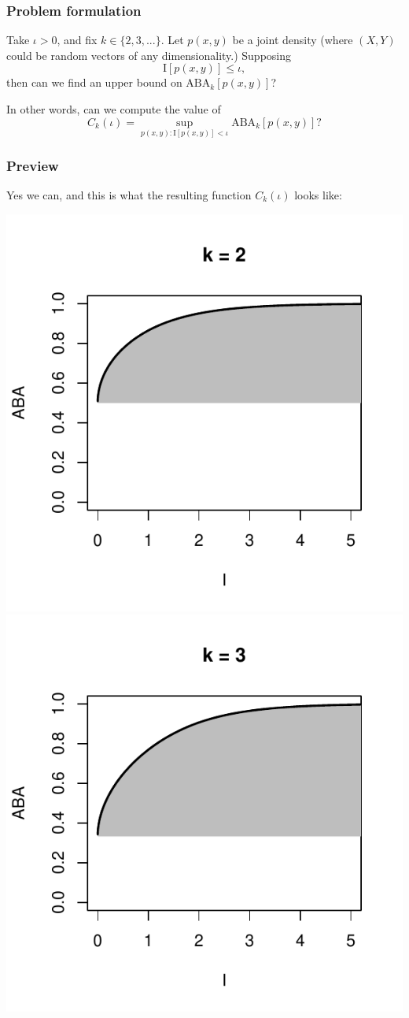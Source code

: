\documentclass{beamer}
\begin{document}
\begin{frame}
\frametitle{Problem formulation} Take $\iota > 0$, and fix $k \in
\{2,3,...\}$.  Let $p(x, y)$ be a joint density (where $(X, Y)$
could be random vectors of any dimensionality.)  Supposing
\[
\text{I}[p(x, y)] \leq \iota,
\]
then can we find an upper bound on $\text{ABA}_k[p(x, y)]$?

In other words, can we compute the value of
\[
C_k(\iota) = \sup_{p(x, y): \text{I}[p(x, y)] < \iota} \text{ABA}_k[p(x, y)]?
\]
\end{frame}

\begin{frame}
\frametitle{Preview}

Yes we can, and this is what the resulting function $C_k(\iota)$ looks like:
\begin{center}
\includegraphics[scale = 0.34]{ck_2.pdf}
\includegraphics[scale = 0.34]{ck_3.pdf}

\end{center}
\end{frame}
\end{document}
